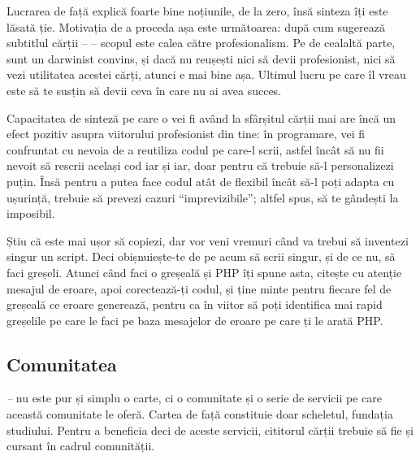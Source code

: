 Lucrarea de față explică foarte bine noțiunile, de la zero, însă sinteza îți
este lăsată ție. Motivația de a proceda așa este următoarea: după cum
sugerează subtitlul cărții -- \textit{\thesubtitle} -- scopul este
calea către profesionalism.
Pe de cealaltă parte, sunt un darwinist convins,
și dacă nu reușești nici să devii profesionist, nici să vezi utilitatea acestei
cărți, atunci e mai bine așa. Ultimul lucru pe care îl vreau este să te susțin
să devii ceva în care nu ai avea succes.

Capacitatea de sinteză pe care o vei fi având la sfârșitul cărții
mai are încă un efect pozitiv asupra viitorului profesionist din tine:
în programare, vei fi confruntat cu nevoia de a reutiliza codul pe care-l scrii, astfel
încât să nu fii nevoit să rescrii același cod iar și iar, doar pentru
că trebuie să-l personalizezi puțin. Însă pentru a putea face
codul atât de flexibil încât să-l poți adapta cu ușurință, trebuie
să prevezi cazuri ``imprevizibile''; altfel spus, să te gândești
la imposibil.


Știu că este mai ușor să copiezi, dar vor veni vremuri când va
trebui să inventezi singur un script. Deci obișnuiește-te de
pe acum să scrii singur, și de ce nu, să faci greșeli. Atunci
când faci o greșeală și PHP îți spune asta, citește cu atenție
mesajul de eroare, apoi corectează-ți codul, și ține minte
pentru fiecare fel de greșeală ce eroare generează, pentru ca
în viitor să poți identifica mai rapid greșelile pe care le faci
pe baza mesajelor de eroare pe care ți le arată PHP.


{}
\subsection*{Comunitatea}
\textit{{\thetitle} -- {\thesubtitle}}
nu este pur și simplu o carte, ci o comunitate și o serie de servicii pe care
această comunitate le oferă. Cartea de față constituie doar scheletul, fundația
studiului. Pentru a beneficia deci de aceste servicii, cititorul cărții
trebuie să fie și cursant în cadrul comunității.

